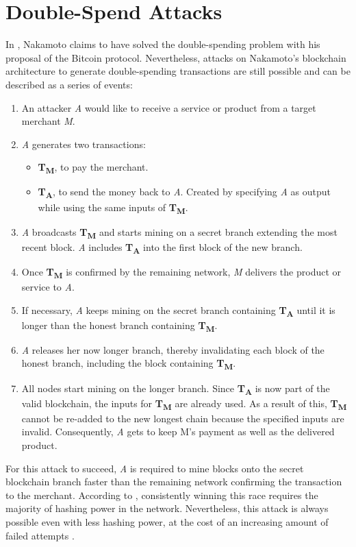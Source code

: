 \documentclass[a4paper,12pt,twoside]{report}
\begin{document}
\section{Double-Spend Attacks} \label{dsa}
\begin{sloppypar} In \cite{nakamoto2008bitcoin}, Nakamoto claims to have solved the double-spending problem with his proposal of the Bitcoin protocol. Nevertheless, attacks on Nakamoto's blockchain architecture to generate double-spending transactions are still possible and can be described as a series of events: \end{sloppypar}
\begin{enumerate}
\item An attacker \textit{A} would like to receive a service or product from a target merchant \textit{M}.
\item \textit{A} generates two transactions:
\begin{itemize}
\item \textbf{T\textsubscript{M}}, to pay the merchant.
\item \textbf{T\textsubscript{A}}, to send the money back to \textit{A}. Created by specifying \textit{A} as output while using the same inputs of \textbf{T\textsubscript{M}}.
\end{itemize}
\item \textit{A} broadcasts \textbf{T\textsubscript{M}} and starts mining on a secret branch extending the most recent block. \textit{A} includes \textbf{T\textsubscript{A}} into the first block of the new branch.
\item Once \textbf{T\textsubscript{M}} is confirmed by the remaining network, \textit{M} delivers the product or service to \textit{A}.
\item If necessary, \textit{A} keeps mining on the secret branch containing \textbf{T\textsubscript{A}} until it is longer than the honest branch containing \textbf{T\textsubscript{M}}.
\item \textit{A} releases her now longer branch, thereby invalidating each block of the honest branch, including the block containing \textbf{T\textsubscript{M}}.
\item All nodes start mining on the longer branch. Since \textbf{T\textsubscript{A}} is now part of the valid blockchain, the inputs for \textbf{T\textsubscript{M}} are already used. As a result of this, \textbf{T\textsubscript{M}} cannot be re-added to the new longest chain because the specified inputs are invalid. Consequently, \textit{A} gets to keep M's payment as well as the delivered product.
\end{enumerate}
For this attack to succeed, \textit{A} is required to mine blocks onto the secret blockchain branch faster than the remaining network confirming the transaction to the merchant. According to \cite{nakamoto2008bitcoin}, consistently winning this race requires the majority of hashing power in the network. Nevertheless, this attack is always possible even with less hashing power, at the cost of an increasing amount of failed attempts \cite{HBDSA,DSAwithTime}.
\end{document}

